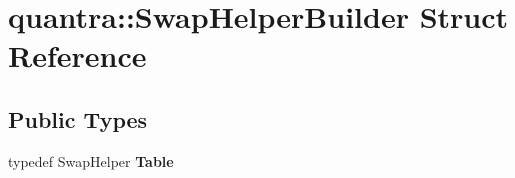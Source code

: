 \hypertarget{structquantra_1_1SwapHelperBuilder}{}\section{quantra\+:\+:Swap\+Helper\+Builder Struct Reference}
\label{structquantra_1_1SwapHelperBuilder}
\subsection*{Public Types}
\begin{DoxyCompactItemize}
\item 
\mbox{\label{structquantra_1_1SwapHelperBuilder_ac797c699a5b56d857a7eb517687e38a9}} 
typedef Swap\+Helper {\bfseries Table}
\end{DoxyCompactItemize}
